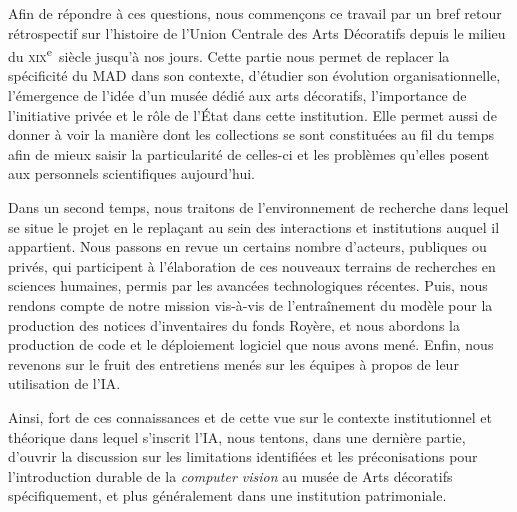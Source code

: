 \documentclass[12pt,twoside]{book}
\begin{document}
Afin de répondre à ces questions, nous commençons ce travail par un bref retour rétrospectif sur l'histoire de l'Union Centrale des Arts Décoratifs depuis le milieu du \textsc{xix}\textsuperscript{e}~siècle jusqu'à nos jours. Cette partie nous permet de replacer la spécificité du MAD dans son contexte, d'étudier son évolution organisationnelle, l'émergence de l'idée d'un musée dédié aux arts décoratifs, l'importance de l'initiative privée et le rôle de l'État dans cette institution. Elle permet aussi de donner à voir la manière dont les collections se sont constituées au fil du temps afin de mieux saisir la particularité de celles-ci et les problèmes qu'elles posent aux personnels scientifiques aujourd'hui. 

Dans un second temps, nous traitons de l'environnement de recherche dans lequel se situe le projet en le replaçant au sein des interactions et institutions auquel il appartient. Nous passons en revue un certains nombre d'acteurs, publiques ou privés, qui participent à l'élaboration de ces nouveaux terrains de recherches en sciences humaines, permis par les avancées technologiques récentes. Puis, nous rendons compte de notre mission vis-à-vis de l'entraînement du modèle pour la production des notices d'inventaires du fonds Royère, et nous abordons la production de code et le déploiement logiciel que nous avons mené. Enfin, nous revenons sur le fruit des entretiens menés sur les équipes à propos de leur utilisation de l'IA.

Ainsi, fort de ces connaissances et de cette vue sur le contexte institutionnel et théorique dans lequel s'inscrit l'IA, nous tentons, dans une dernière partie, d'ouvrir la discussion sur les limitations identifiées et les préconisations pour l'introduction durable de la \textit{computer vision} au musée de Arts décoratifs spécifiquement, et plus généralement dans une institution patrimoniale. 

\mainmatter





	


	


		

\end{document}
